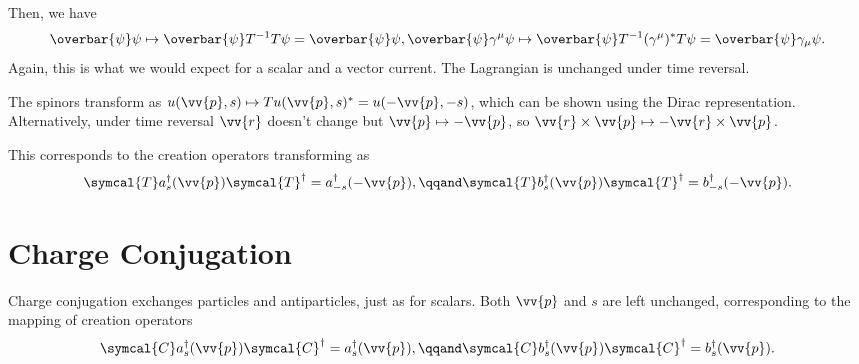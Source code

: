 \documentclass[fleqn]{NotesClass}
\newcommand{\chargeConjugation}{\symcal{C}}
\newcommand{\timeReversal}{\symcal{T}}
\newcommand{\hermit}{{\dagger}}
\newcommand{\diracadjoint}[1]{\overbar{#1}}
\begin{document}
    Then, we have
    \begin{equation}
        \diracadjoint{\psi}\psi \mapsto \diracadjoint{\psi}T^{-1}T\psi = \diracadjoint{\psi}\psi,\\
        \diracadjoint{\psi}\gamma^\mu\psi \mapsto \diracadjoint{\psi}T^{-1} (\gamma^\mu)^*T\psi = \diracadjoint{\psi}\gamma_\mu \psi.
    \end{equation}
    Again, this is what we would expect for a scalar and a vector current.
    The Lagrangian is unchanged under time reversal.
    
    The spinors transform as \(u(\vv{p}, s) \mapsto Tu(\vv{p}, s)^* = u(-\vv{p}, -s)\), which can be shown using the Dirac representation.
    Alternatively, under time reversal \(\vv{r}\) doesn't change but \(\vv{p} \mapsto -\vv{p}\), so \(\vv{r} \times \vv{p} \mapsto -\vv{r} \times \vv{p}\).
    
    This corresponds to the creation operators transforming as
    \begin{equation}
        \timeReversal a_s^\hermit(\vv{p}) \timeReversal^\hermit = a_{-s}^\hermit(-\vv{p}), \qqand \timeReversal b_s^\hermit(\vv{p}) \timeReversal^\hermit = b_{-s}^\hermit(-\vv{p}).
    \end{equation}
    
    \section{Charge Conjugation}
    Charge conjugation exchanges particles and antiparticles, just as for scalars.
    Both \(\vv{p}\) and \(s\) are left unchanged, corresponding to the mapping of creation operators
    \begin{equation}
        \chargeConjugation a_s^\hermit(\vv{p}) \chargeConjugation^\hermit = a_{s}^\hermit(\vv{p}), \qqand \chargeConjugation b_s^\hermit(\vv{p}) \chargeConjugation^\hermit = b_{s}^\hermit(\vv{p}).
    \end{equation}
    
\end{document}
